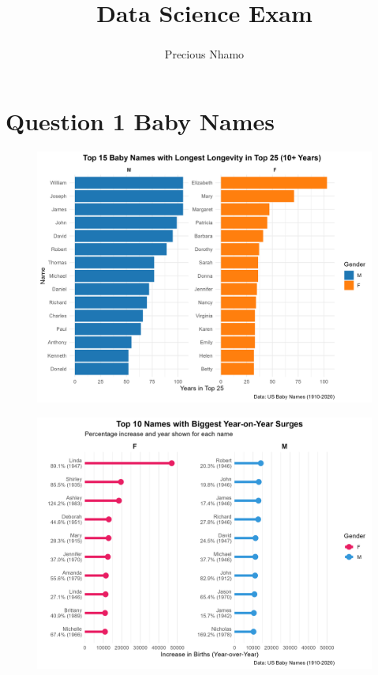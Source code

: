 \documentclass[
  man,floatsintext]{apa6}
\title{Data Science Exam}
\author{Precious Nhamo\textsuperscript{}}
\date{}
\affiliation{\phantom{0}}
\begin{document}
\maketitle

\section{Question 1 Baby Names}\label{question-1-baby-names}

\begin{figure}
\includegraphics[width=0.9\linewidth]{../Question1/Results/nametime} \caption{ }\label{fig:bubble-image-1}
\end{figure}
\begin{figure}
\includegraphics[width=0.9\linewidth]{../Question1/Results/yearonyear} \caption{ }\label{fig:bubble-image-2}
\end{figure}
\end{document}
